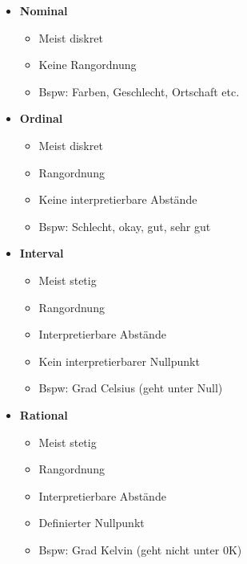 \begin{flushleft}
\begin{itemize}
	\item \textbf{Nominal}
		\begin{itemize}
			\item Meist diskret
			\item Keine Rangordnung
			\item Bspw: Farben, Geschlecht, Ortschaft etc.
		\end{itemize} 
	\item \textbf{Ordinal}
		\begin{itemize}
			\item Meist diskret
			\item Rangordnung
			\item Keine interpretierbare Abstände
			\item Bspw: Schlecht, okay, gut, sehr gut
		\end{itemize} 
	\item \textbf{Interval}
		\begin{itemize}
			\item Meist stetig
			\item Rangordnung
			\item Interpretierbare Abstände
			\item Kein interpretierbarer Nullpunkt
			\item Bspw: Grad Celsius (geht unter Null)
		\end{itemize} 
	\item \textbf{Rational}
		\begin{itemize}
			\item Meist stetig
			\item Rangordnung
			\item Interpretierbare Abstände
			\item Definierter Nullpunkt
			\item Bspw: Grad Kelvin (geht nicht unter 0K)
		\end{itemize} 

\end{itemize}

\end{flushleft}
